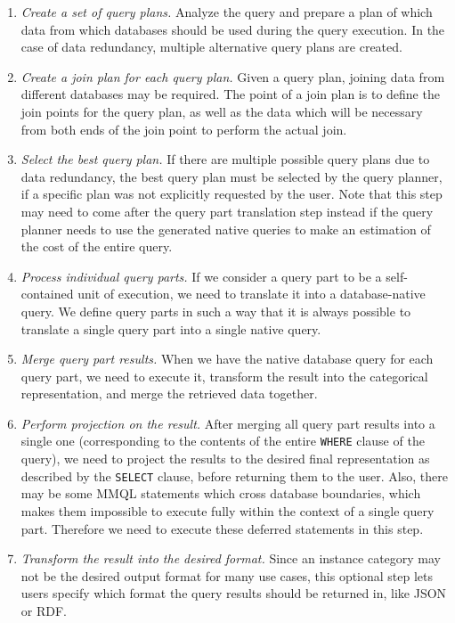 \begin{enumerate}
    \item \textit{Create a set of query plans.} Analyze the query and prepare a plan of which data from which databases should be used during the query execution. In the case of data redundancy, multiple alternative query plans are created.
    \item \textit{Create a join plan for each query plan.} Given a query plan, joining data from different databases may be required. The point of a join plan is to define the join points for the query plan, as well as the data which will be necessary from both ends of the join point to perform the actual join.
    \item \textit{Select the best query plan.} If there are multiple possible query plans due to data redundancy, the best query plan must be selected by the query planner, if a specific plan was not explicitly requested by the user. Note that this step may need to come after the query part translation step instead if the query planner needs to use the generated native queries to make an estimation of the cost of the entire query.
    \item \textit{Process individual query parts.} If we consider a query part to be a self-contained unit of execution, we need to translate it into a database-native query. We define query parts in such a way that it is always possible to translate a single query part into a single native query.
    \item \textit{Merge query part results.} When we have the native database query for each query part, we need to execute it, transform the result into the categorical representation, and merge the retrieved data together.
    \item \textit{Perform projection on the result.} After merging all query part results into a single one (corresponding to the contents of the entire \texttt{WHERE} clause of the query), we need to project the results to the desired final representation as described by the \texttt{SELECT} clause, before returning them to the user. Also, there may be some MMQL statements which cross database boundaries, which makes them impossible to execute fully within the context of a single query part. Therefore we need to execute these deferred statements in this step.
    \item \textit{Transform the result into the desired format.} Since an instance category may not be the desired output format for many use cases, this optional step lets users specify which format the query results should be returned in, like JSON or RDF.
\end{enumerate}

